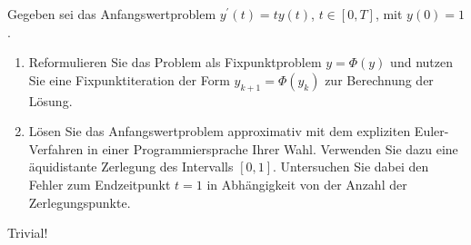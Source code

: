 \begin{exercise}

Gegeben sei das Anfangswertproblem $y^\prime(t) = t y(t)$, $t \in [0, T]$, mit $y(0) = 1$.

\begin{enumerate}[label = \textbf{\alph*)}]

  \item
  Reformulieren Sie das Problem als Fixpunktproblem $y = \Phi(y)$ und nutzen Sie eine Fixpunktiteration der Form $y_{k+1} = \Phi(y_k)$ zur Berechnung der Lösung.

  \item
  Lösen Sie das Anfangswertproblem approximativ mit dem expliziten Euler-Verfahren in einer
  Programmiersprache Ihrer Wahl.
  Verwenden Sie dazu eine äquidistante Zerlegung des Intervalls $[0, 1]$.
  Untersuchen Sie dabei den Fehler zum Endzeitpunkt $t = 1$ in Abhängigkeit von der Anzahl der Zerlegungspunkte.

\end{enumerate}

\end{exercise}

\begin{solution}

Trivial!

\end{solution}
